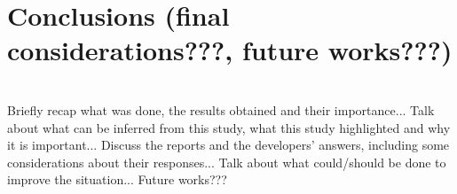 \documentclass[Lau,oneside]{sapthesis}%
\begin{document}
\chapter{Conclusions (final considerations???, future works???)}
\ \\
Briefly recap what was done, the results obtained and their importance...
\newline \newline
Talk about what can be inferred from this study, what this study highlighted and why it is important...
\newline \newline
Discuss the reports and the developers' answers, including some considerations about their responses...
\newline \newline
Talk about what could/should be done to improve the situation...
\newline \newline
Future works???
\end{document}
